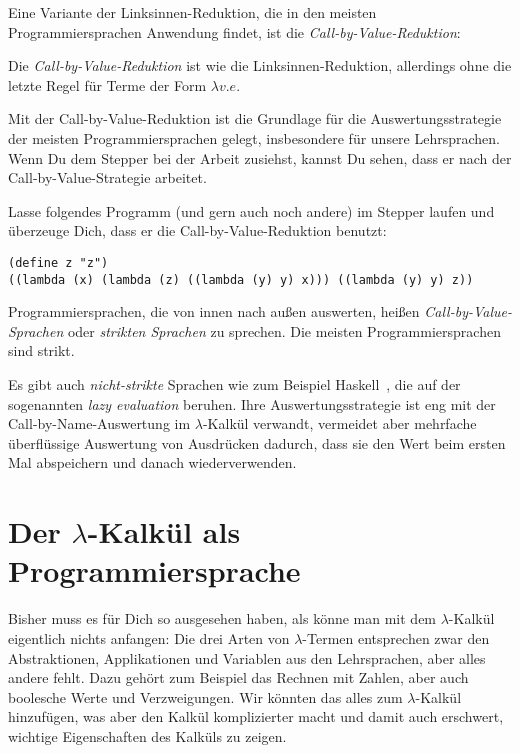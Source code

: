 \label{page:call-by-value}
Eine Variante der Linksinnen-Reduktion, die in den meisten
Programmiersprachen Anwendung findet, ist die
\textit{Call-by-Value-Reduktion}:
%
\begin{definition}\label{def:call-by-value}
    Die \textit{Call-by-Value-Reduktion} ist wie die
  Linksinnen-Reduktion, allerdings ohne die letzte Regel für Terme der
  Form $\lambda v.e$.
\end{definition}
%
Mit der Call-by-Value-Reduktion ist die Grundlage für die
Auswertungsstrategie der meisten Programmiersprachen gelegt,
insbesondere für unsere Lehrsprachen.  Wenn Du dem Stepper bei der
Arbeit zusiehst, kannst Du sehen, dass er nach der
Call-by-Value-Strategie arbeitet.
%
\begin{aufgabeinline}
  Lasse folgendes Programm (und gern auch noch andere) im Stepper
  laufen und überzeuge Dich, dass er die Call-by-Value-Reduktion
  benutzt:
\begin{lstlisting}
(define z "z")
((lambda (x) (lambda (z) ((lambda (y) y) x))) ((lambda (y) y) z))
\end{lstlisting}
\end{aufgabeinline}
%
Programmiersprachen, die von innen nach außen auswerten, heißen
\textit{Call-by-Value-Sprachen} oder
\textit{strikten Sprachen} zu sprechen.
Die meisten Programmiersprachen sind strikt.

Es gibt auch \textit{nicht-strikte}
Sprachen wie zum Beispiel Haskell~\cite{Haskell2010},
die auf der sogenannten \textit{lazy evaluation} beruhen.  Ihre
Auswertungsstrategie ist eng mit der Call-by-Name-Auswertung im
$\lambda$-Kalkül verwandt, vermeidet
aber mehrfache überflüssige Auswertung von Ausdrücken dadurch, dass sie den
Wert beim ersten Mal abspeichern und danach wiederverwenden.

\section{Der $\lambda$-Kalkül als Programmiersprache}
\label{sec:lambdaprog}

Bisher muss es für Dich so ausgesehen haben, als könne man mit dem
$\lambda$-Kalkül eigentlich nichts anfangen: Die drei Arten von
$\lambda$-Termen entsprechen zwar den Abstraktionen, Applikationen und
Variablen aus den Lehrsprachen, aber alles andere fehlt.  Dazu gehört
zum Beispiel das Rechnen mit Zahlen, aber auch boolesche Werte und
Verzweigungen. Wir könnten das alles zum $\lambda$-Kalkül hinzufügen,
was aber den Kalkül komplizierter macht und damit auch erschwert,
wichtige Eigenschaften des Kalküls zu zeigen.

